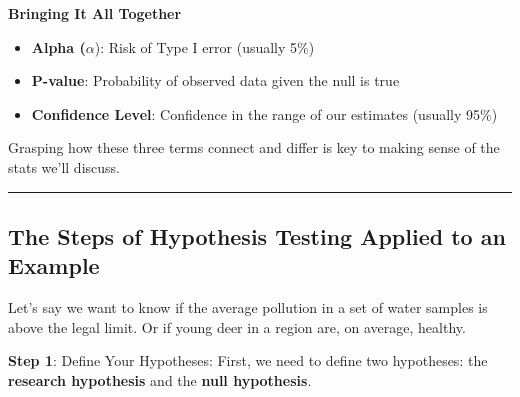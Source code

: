 \documentclass[
  letterpaper,
  DIV=11,
  numbers=noendperiod]{scrreprt}
\providecommand{\tightlist}{%
  \setlength{\itemsep}{0pt}\setlength{\parskip}{0pt}}\usepackage{longtable,booktabs,array}
\begin{document}
\textbf{Bringing It All Together}

\begin{itemize}
\tightlist
\item
  \textbf{Alpha (}\(\alpha\)): Risk of Type I error (usually 5\%)
\item
  \textbf{P-value}: Probability of observed data given the null is true
\item
  \textbf{Confidence Level}: Confidence in the range of our estimates
  (usually 95\%)
\end{itemize}

Grasping how these three terms connect and differ is key to making sense
of the stats we'll discuss.

\begin{center}\rule{0.5\linewidth}{0.5pt}\end{center}

\subsection{The Steps of Hypothesis Testing Applied to an
Example}\label{the-steps-of-hypothesis-testing-applied-to-an-example}

Let's say we want to know if the average pollution in a set of water
samples is above the legal limit. Or if young deer in a region are, on
average, healthy.

\textbf{Step 1}: Define Your Hypotheses: First, we need to define two
hypotheses: the \textbf{research hypothesis} and the \textbf{null
hypothesis}.
\end{document}
